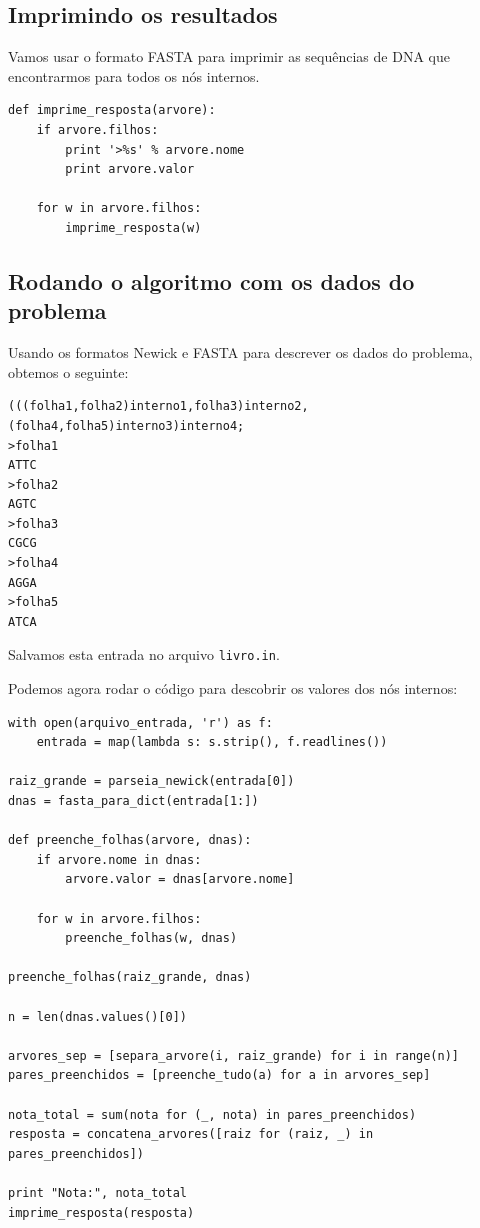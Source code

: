 \documentclass[11pt]{article}
\begin{document}
\subsection{Imprimindo os resultados}
\label{sec-3-4}

Vamos usar o formato FASTA para imprimir as sequências de DNA que
encontrarmos para todos os nós internos.

\begin{verbatim}
def imprime_resposta(arvore):
    if arvore.filhos:
        print '>%s' % arvore.nome
        print arvore.valor

    for w in arvore.filhos:
        imprime_resposta(w)
\end{verbatim}


\subsection{Rodando o algoritmo com os dados do problema}
\label{sec-3-5}

Usando os formatos Newick e FASTA para descrever os dados do problema,
obtemos o seguinte:

\begin{verbatim}
(((folha1,folha2)interno1,folha3)interno2,(folha4,folha5)interno3)interno4;
>folha1
ATTC
>folha2
AGTC
>folha3
CGCG
>folha4
AGGA
>folha5
ATCA
\end{verbatim}

Salvamos esta entrada no arquivo \verb~livro.in~.

Podemos agora rodar o código para descobrir os valores dos nós internos:

\begin{verbatim}
with open(arquivo_entrada, 'r') as f:
    entrada = map(lambda s: s.strip(), f.readlines())

raiz_grande = parseia_newick(entrada[0])
dnas = fasta_para_dict(entrada[1:])

def preenche_folhas(arvore, dnas):
    if arvore.nome in dnas:
        arvore.valor = dnas[arvore.nome]

    for w in arvore.filhos:
        preenche_folhas(w, dnas)

preenche_folhas(raiz_grande, dnas)

n = len(dnas.values()[0])

arvores_sep = [separa_arvore(i, raiz_grande) for i in range(n)]
pares_preenchidos = [preenche_tudo(a) for a in arvores_sep]

nota_total = sum(nota for (_, nota) in pares_preenchidos)
resposta = concatena_arvores([raiz for (raiz, _) in pares_preenchidos])

print "Nota:", nota_total
imprime_resposta(resposta)
\end{verbatim}
\end{document}
